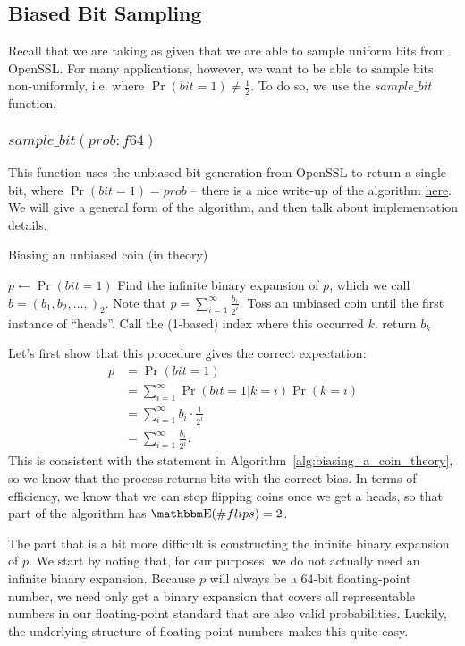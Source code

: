 \documentclass[11pt]{scrartcl} %
\begin{document}
\subsection{Biased Bit Sampling}
Recall that we are taking as given that we are able to sample uniform bits from OpenSSL.
For many applications, however, we want to be able to sample bits non-uniformly,
i.e. where $\Pr(bit = 1) \neq \frac{1}{2}$. To do so, we use the $sample\_bit$ function.

\subsubsection{$sample\_bit(prob: f64)$}
This function uses the unbiased bit generation from OpenSSL to return a single bit, where $\Pr(bit = 1) = prob$ --
there is a nice write-up of the algorithm \href{https://amakelov.wordpress.com/2013/10/10/arbitrarily-biasing-a-coin-in-2-expected-tosses/}{here}.
We will give a general form of the algorithm, and then talk about implementation details.
\begin{algorithm}[H]
	\caption{Biasing an unbiased coin (in theory)}
	\label{alg:biasing_a_coin_theory}
	\begin{algorithmic}[1]
		\State $p \gets \Pr(bit = 1)$
		\State Find the infinite binary expansion of $p$, which we call $b = (b_1, b_2, \hdots,)_2$.
		Note that $p = \sum_{i=1}^{\infty}\frac{b_i}{2^i}$.
		\State Toss an unbiased coin until the first instance of ``heads''. Call the (1-based) index where this occurred $k$.
		\State return $b_k$
	\end{algorithmic}
\end{algorithm}
Let's first show that this procedure gives the correct expectation:
\begin{align*}
	p &= \Pr(bit = 1) \\
		 &= \sum_{i=1}^{\infty} \Pr(bit = 1 \vert k = i) \Pr(k = i) \\
		 &= \sum_{i=1}^{\infty} b_i \cdot \frac{1}{2^i} \\
		 &= \sum_{i=1}^{\infty}\frac{b_i}{2^i}.
\end{align*}
This is consistent with the statement in Algorithm~\ref{alg:biasing_a_coin_theory}, so we know that
the process returns bits with the correct bias.
In terms of efficiency, we know that we can stop flipping coins once we get a heads,
so that part of the algorithm has $\E(\# flips) = 2$. \newline

The part that is a bit more difficult is constructing the infinite binary expansion of $p$.
We start by noting that, for our purposes, we do not actually need an infinite binary expansion.
Because $p$ will always be a 64-bit floating-point number, we need only get a binary
expansion that covers all representable numbers in our floating-point standard that are
also valid probabilities.
Luckily, the underlying structure of floating-point numbers makes this quite easy. \newline
\end{document}
